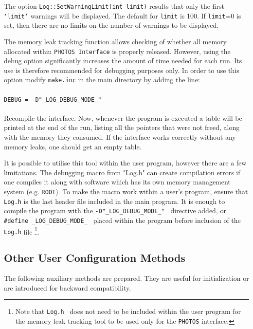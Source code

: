 \documentclass[]{Photos_interface_design}
\begin{document}
The option {\tt Log::SetWarningLimit(int limit)} results that
only the first {\tt `limit'} warnings will be  displayed. The default for {\tt limit} is 100. 
If {\tt limit}=0 is set, then there are no limits on the number of warnings to be displayed.

The memory leak tracking function allows checking of whether all memory allocated within {\tt PHOTOS Interface}
 is properly released. However, using the debug option significantly increases the amount of time needed for 
each run. Its  use is therefore recommended  for debugging purposes only. In order to use this option
 modify {\tt make.inc} in the main directory by adding the line: \\
\\ {\tt DEBUG = -D"\_LOG\_DEBUG\_MODE\_" } \\ \\
Recompile the interface.
Now, whenever the program is executed a table will be printed at the end of the run,
listing all the pointers that were not freed, along with the memory they consumed.
If the interface works correctly without any memory leaks, one should get an empty table.

It is possible to utilise this tool within the user program, however there are a few limitations.
The debugging macro from "Log.h" can create compilation errors if one compiles
it along with software which has its own memory management system (e.g. {\tt ROOT}).
To make the macro work within a user's program, ensure that {\tt Log.h} is the last header file
included in the main program.
It is enough to  compile the program with the {\tt -D"\_LOG\_DEBUG\_MODE\_" } directive added,
or {\tt \#define \_LOG\_DEBUG\_MODE\_ } placed within the program before inclusion of
 the {\tt Log.h} file%
\footnote{Note that {\tt Log.h } does not need to be included within
the user program  for the memory leak tracking tool to be used only for the {\tt PHOTOS} interface.
}.

\subsection{Other User Configuration Methods}
\label{subsection:other_methods}

The following auxiliary methods are prepared. They are useful for initialization 
or are introduced for backward compatibility.
\end{document}
